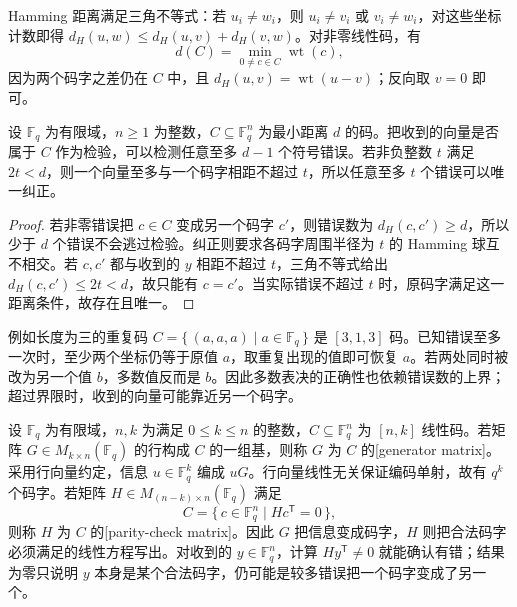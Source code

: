 \ProseParagraphBreak
Hamming 距离满足三角不等式：若 \(u_i\ne w_i\)，则 \(u_i\ne v_i\) 或 \(v_i\ne w_i\)，对这些坐标计数即得 \(d_H(u,w)\leq d_H(u,v)+d_H(v,w)\)。对非零线性码，有
\begin{equation}\label{b1:eq:B-linear-distance}
	d(C)=\min_{0\ne c\in C}\operatorname{wt}(c),
\end{equation}
因为两个码字之差仍在 \(C\) 中，且 \(d_H(u,v)=\operatorname{wt}(u-v)\)；反向取 \(v=0\) 即可。

\begin{proposition}\label{b1:prop:B-distance-correction}
	设 \(\mathbb F_q\) 为有限域，\(n\geq1\) 为整数，\(C\subseteq\mathbb F_q^n\) 为最小距离 \(d\) 的码。把收到的向量是否属于 \(C\) 作为检验，可以检测任意至多 \(d-1\) 个符号错误。若非负整数 \(t\) 满足 \(2t<d\)，则一个向量至多与一个码字相距不超过 \(t\)，所以任意至多 \(t\) 个错误可以唯一纠正。
\end{proposition}

\begin{proof}
	若非零错误把 \(c\in C\) 变成另一个码字 \(c'\)，则错误数为 \(d_H(c,c')\geq d\)，所以少于 \(d\) 个错误不会逃过检验。纠正则要求各码字周围半径为 \(t\) 的 Hamming 球互不相交。若 \(c,c'\) 都与收到的 \(y\) 相距不超过 \(t\)，三角不等式给出 \(d_H(c,c')\leq2t<d\)，故只能有 \(c=c'\)。当实际错误不超过 \(t\) 时，原码字满足这一距离条件，故存在且唯一。
\end{proof}

例如长度为三的重复码 \(C=\{\,(a,a,a)\mid a\in\mathbb F_q\,\}\) 是 \([3,1,3]\) 码。已知错误至多一次时，至少两个坐标仍等于原值 \(a\)，取重复出现的值即可恢复 \(a\)。若两处同时被改为另一个值 \(b\)，多数值反而是 \(b\)。因此多数表决的正确性也依赖错误数的上界；超过界限时，收到的向量可能靠近另一个码字。

\ProseParagraphBreak
设 \(\mathbb F_q\) 为有限域，\(n,k\) 为满足 \(0\leq k\leq n\) 的整数，\(C\subseteq\mathbb F_q^n\) 为 \([n,k]\) 线性码。若矩阵 \(G\in M_{k\times n}(\mathbb F_q)\) 的行构成 \(C\) 的一组基，则称 \(G\) 为 \(C\) 的[generator matrix]。采用行向量约定，信息 \(u\in\mathbb F_q^k\) 编成 \(uG\)。行向量线性无关保证编码单射，故有 \(q^k\) 个码字。若矩阵 \(H\in M_{(n-k)\times n}(\mathbb F_q)\) 满足
\[
	C=\{\,c\in\mathbb F_q^n\mid Hc^{\mathsf T}=0\,\},
\]
则称 \(H\) 为 \(C\) 的[parity-check matrix]。因此 \(G\) 把信息变成码字，\(H\) 则把合法码字必须满足的线性方程写出。对收到的 \(y\in\mathbb F_q^n\)，计算 \(Hy^{\mathsf T}\ne0\) 就能确认有错；结果为零只说明 \(y\) 本身是某个合法码字，仍可能是较多错误把一个码字变成了另一个。

